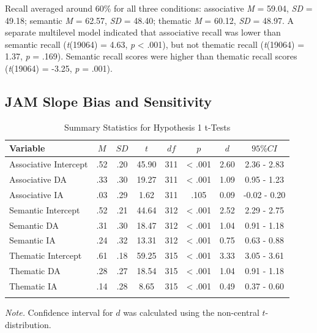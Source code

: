 \documentclass[english,,man]{apa6}
\begin{document}
Recall averaged around 60\% for all three conditions: associative \emph{M} = 59.04, \emph{SD} = 49.18; semantic \emph{M} = 62.57, \emph{SD} = 48.40; thematic \emph{M} = 60.12, \emph{SD} = 48.97. A separate multilevel model indicated that associative recall was lower than semantic recall (\emph{t}(19064) = 4.63, \emph{p} \textless{} .001), but not thematic recall (\emph{t}(19064) = 1.37, \emph{p} = .169). Semantic recall scores were higher than thematic recall scores (\emph{t}(19064) = -3.25, \emph{p} = .001).

\hypertarget{jam-slope-bias-and-sensitivity}{%
\subsection{JAM Slope Bias and Sensitivity}\label{jam-slope-bias-and-sensitivity}}

\begin{table}[tbp]
\begin{center}
\begin{threeparttable}
\caption{\label{tab:hyp1-table1}Summary Statistics for Hypothesis 1 t-Tests}
\begin{tabular}{lccccccc}
\toprule
Variable & $M$ & $SD$ & $t$ & $df$ & $p$ & $d$ & $95\% CI$\\
\midrule
Associative Intercept & .52 & .20 & 45.90 & 311 & < .001 & 2.60 & 2.36 - 2.83\\
Associative DA & .33 & .30 & 19.27 & 311 & < .001 & 1.09 & 0.95 - 1.23\\
Associative IA & .03 & .29 & 1.62 & 311 & .105 & 0.09 & -0.02 - 0.20\\
Semantic Intercept & .52 & .21 & 44.64 & 312 & < .001 & 2.52 & 2.29 - 2.75\\
Semantic DA & .31 & .30 & 18.47 & 312 & < .001 & 1.04 & 0.91 - 1.18\\
Semantic IA & .24 & .32 & 13.31 & 312 & < .001 & 0.75 & 0.63 - 0.88\\
Thematic Intercept & .61 & .18 & 59.25 & 315 & < .001 & 3.33 & 3.05 - 3.61\\
Thematic DA & .28 & .27 & 18.54 & 315 & < .001 & 1.04 & 0.91 - 1.18\\
Thematic IA & .14 & .28 & 8.65 & 315 & < .001 & 0.49 & 0.37 - 0.60\\
\bottomrule
\addlinespace
\end{tabular}
\begin{tablenotes}[para]
\normalsize{\textit{Note.} Confidence interval for $d$ was calculated using the non-central $t$-distribution. }
\end{tablenotes}
\end{threeparttable}
\end{center}
\end{table}
\end{document}
